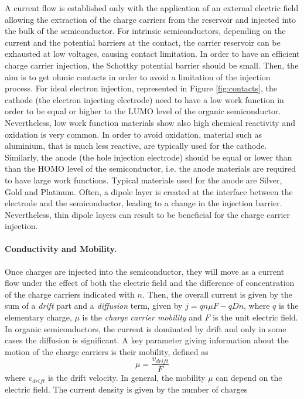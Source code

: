 \documentclass  [
  paper    = a4,
  BCOR     = 10mm,
  twoside,
  fontsize = 12pt,
  fleqn,
  toc      = bibnumbered,
  toc      = listofnumbered,
  numbers  = noendperiod,
  headings = normal,
  listof   = leveldown,
  version  = 3.03
]                                       {scrreprt}
\begin{document}
A current flow is established only with the application of an external electric field allowing the extraction of the charge carriers from the reservoir and injected into the bulk of the semiconductor. For intrinsic semiconductors, depending on the current and the potential barriers at the contact, the carrier reservoir can be exhausted at low voltages, causing contact limitation. In order to have an efficient charge carrier injection, the Schottky potential barrier should be small. Then, the aim is to get ohmic contacts in order to avoid a limitation of the injection process. For ideal electron injection, represented in Figure \ref{fig:contacts}, the cathode (the electron injecting electrode) need to have a low work function in order to be equal or higher to the LUMO level of the organic semiconductor. Nevertheless, low work function materials show also high chemical reactivity and oxidation is very common. In order to avoid oxidation, material such as aluminium, that is much less reactive, are typically used for the cathode. Similarly, the anode (the hole injection electrode) should be equal or lower than than the HOMO level of the semiconductor, i.e. the anode materials are required to have large work functions. Typical materials used for the anode are Silver, Gold and Platinum. Often, a dipole layer is created at the interface between the electrode and the semiconductor, leading to a change in the injection barrier. Nevertheless, thin dipole layers can result to be beneficial for the charge carrier injection.\\

\paragraph{Conductivity and Mobility.} Once charges are injected into the semiconductor, they will move as a current flow under the effect of both the electric field and the difference of concentration of the charge carriers indicated with $n$. Then, the overall current is given by the sum of a \emph{drift} part and a \emph{diffusion} term, given by $j = q n \mu F - q D  n$, where $q$ is the elementary charge, $\mu$ is the \emph{charge carrier mobility} and $F$ is the unit electric field. In organic semiconductors, the current is dominated by drift and only in some cases the diffusion is significant. A key parameter giving information about the motion of the charge carriers is their mobility, defined as
\begin{equation}
\mu = \frac{v_{drift}}{F}
\label{eq:mobility}
\end{equation}
where $v_{drift}$ is the drift velocity. In general, the mobility $\mu$ can depend on the electric field. The current density is given by the number of charges
\end{document}
